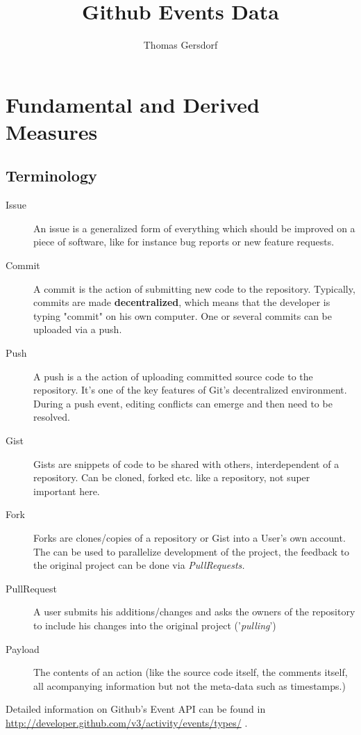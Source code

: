 \documentclass[a4paper,10pt]{article}
\title{Github Events Data}
\author{Thomas Gersdorf}
\begin{document}
\maketitle


\tableofcontents


\section{Fundamental and Derived Measures}
\subsection{Terminology}
\begin{description}
\item[Issue] An issue is a generalized form of everything which should be improved on a piece of software, like for instance bug reports or new feature requests.
\item [Commit] A commit is the action of submitting new code to the repository. Typically, commits are made \textbf{decentralized}, which means that the developer is typing "commit" on his own computer. One or several commits can be uploaded via a push.
\item [Push ] A push is a the action of uploading committed source code to the repository. It's one of the key features of Git's decentralized environment. During a push event, editing conflicts can emerge and then need to be resolved.
 \item[Gist] Gists are snippets of code to be shared with others, interdependent of a repository. Can be cloned, forked etc. like a repository, not super important here.
\item [Fork] Forks are clones/copies of a repository or Gist into a User's own account. The can be used to parallelize development of the project, the feedback to the original project can be done via \textit{PullRequests.}
\item [PullRequest] A user submits his additions/changes and asks the owners of the repository to include his changes into the original project ('\textit{pulling}')
\item [Payload] The contents of an action (like the source code itself, the comments itself, all acompanying information but not the meta-data such as timestamps.)
\end{description}

Detailed information on Github's Event API can be found in \url{http://developer.github.com/v3/activity/events/types/} .
\end{document}
